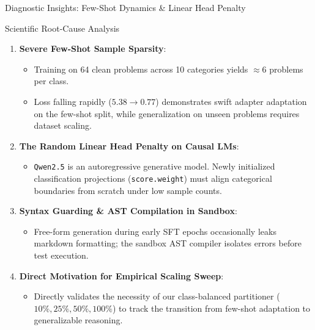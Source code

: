 \documentclass[aspectratio=169,10pt]{beamer}
\begin{document}
\begin{frame}{Diagnostic Insights: Few-Shot Dynamics \& Linear Head Penalty}
  \begin{alertblock}{Scientific Root-Cause Analysis}
    \begin{enumerate}\itemsep=3pt\footnotesize
      \item \textbf{Severe Few-Shot Sample Sparsity}:
        \begin{itemize}\scriptsize
          \item Training on 64 clean problems across 10 categories yields $\approx 6$ problems per class.
          \item Loss falling rapidly ($5.38 \to 0.77$) demonstrates swift adapter adaptation on the few-shot split, while generalization on unseen problems requires dataset scaling.
        \end{itemize}
      \item \textbf{The Random Linear Head Penalty on Causal LMs}:
        \begin{itemize}\scriptsize
          \item \texttt{Qwen2.5} is an autoregressive generative model. Newly initialized classification projections (\texttt{score.weight}) must align categorical boundaries from scratch under low sample counts.
        \end{itemize}
      \item \textbf{Syntax Guarding \& AST Compilation in Sandbox}:
        \begin{itemize}\scriptsize
          \item Free-form generation during early SFT epochs occasionally leaks markdown formatting; the sandbox AST compiler isolates errors before test execution.
        \end{itemize}
      \item \textbf{Direct Motivation for Empirical Scaling Sweep}:
        \begin{itemize}\scriptsize
          \item Directly validates the necessity of our class-balanced partitioner ($10\%, 25\%, 50\%, 100\%$) to track the transition from few-shot adaptation to generalizable reasoning.
        \end{itemize}
    \end{enumerate}
  \end{alertblock}
\end{frame}

\end{document}
